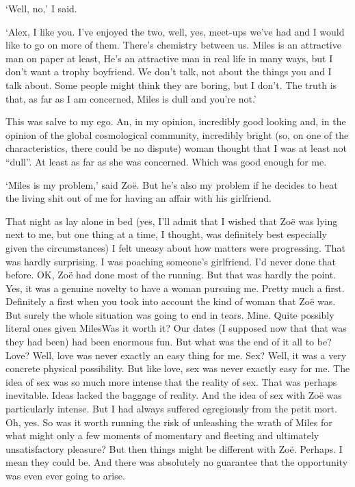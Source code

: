 `Well, no,' I said.

`Alex, I like you. I've enjoyed the two, well, yes, meet-ups  we've had and I would like to go on more of them. There's chemistry between us. Miles is an
attractive man on paper at least, He's an attractive man in real life in many ways, but I don't want a trophy
boyfriend. We don't talk, not about the things you and I talk about. Some people might think they are boring, but I don't.
The truth is that, as far as I am concerned, Miles is dull and you're not.'

This was salve to my ego. An, in my opinion, incredibly good looking
and, in the opinion of the global cosmological community, incredibly
bright (so, on one of the characteristics, there could be no
dispute) woman thought that I was at least not ``dull''. At least as far as she was concerned. Which was good enough for me.

`Miles is my problem,' said Zo{\"e}. But he's also my problem if he
decides to beat the living shit out of me for having an affair with
his girlfriend.

That night as lay alone in bed (yes, I'll admit that I wished that
Zo{\"e} was lying next to me, but one thing at a time, I thought,
was definitely best especially given the circumstances) I felt uneasy about how
matters were progressing. That was hardly surprising. I was poaching
someone's girlfriend. I'd never done that before. OK, Zo{\"e} had
done most of the running. But that was hardly the point. Yes, it was
a genuine novelty to have a woman pursuing me. Pretty much a first.
Definitely a first when you took into account the kind of woman that
Zo{\"e} was. But surely the whole situation was going to end in tears.
Mine. Quite possibly literal ones given MilesWas it worth it? Our dates (I supposed now that that was they
had been) had been enormous fun. But what was the end of it all to
be? Love? Well, love was never exactly an easy thing for me. Sex?
Well, it was a very concrete physical possibility. But like love,
sex was never exactly easy for me. The idea of sex was so much more
intense that the reality of sex. That was perhaps inevitable. Ideas
lacked the baggage of reality. And the idea of sex with Zo{\"e} was particularly intense. But I had always suffered egregiously
from the petit mort. Oh, yes. So was it worth running the risk of
unleashing the wrath of Miles for what might only a few moments of
momentary and fleeting and ultimately unsatisfactory pleasure? But then things might be different with Zo{\"e}. Perhaps. I mean they could be. And there was absolutely no guarantee that the opportunity was even ever going to arise.

